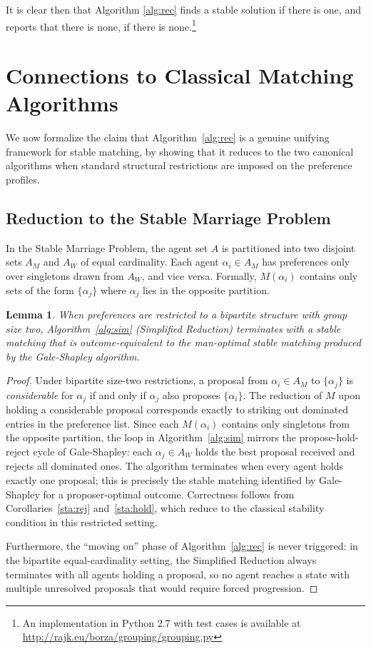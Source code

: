 \documentclass{elsarticle}
\newtheorem{mylem}{Lemma}
\begin{document}
It is clear then that Algorithm \ref{alg:rec} finds a stable solution if there is one, and reports that there is none, if there is none.\footnote{An implementation in Python 2.7 with test cases is available at \url{http://rajk.eu/borza/grouping/grouping.py}}

\section{Connections to Classical Matching Algorithms}
\label{sec:connections}

We now formalize the claim that Algorithm~\ref{alg:rec} is a genuine unifying framework for stable matching, by showing that it reduces to the two canonical algorithms when standard structural restrictions are imposed on the preference profiles.

\subsection{Reduction to the Stable Marriage Problem}

In the Stable Marriage Problem, the agent set $A$ is partitioned into two disjoint sets $A_M$ and $A_W$ of equal cardinality. Each agent $\alpha_i \in A_M$ has preferences only over singletons drawn from $A_W$, and vice versa. Formally, $M(\alpha_i)$ contains only sets of the form $\{\alpha_j\}$ where $\alpha_j$ lies in the opposite partition.

\begin{mylem}
\label{lem:gs}
When preferences are restricted to a bipartite structure with group size two, Algorithm~\ref{alg:sim} (Simplified Reduction) terminates with a stable matching that is outcome-equivalent to the man-optimal stable matching produced by the Gale-Shapley algorithm.
\end{mylem}

\begin{proof}
Under bipartite size-two restrictions, a proposal from $\alpha_i \in A_M$ to $\{\alpha_j\}$ is \emph{considerable} for $\alpha_j$ if and only if $\alpha_j$ also proposes $\{\alpha_i\}$. The reduction of $M$ upon holding a considerable proposal corresponds exactly to striking out dominated entries in the preference list. Since each $M(\alpha_i)$ contains only singletons from the opposite partition, the loop in Algorithm~\ref{alg:sim} mirrors the propose-hold-reject cycle of Gale-Shapley: each $\alpha_j \in A_W$ holds the best proposal received and rejects all dominated ones. The algorithm terminates when every agent holds exactly one proposal; this is precisely the stable matching identified by Gale-Shapley for a proposer-optimal outcome. Correctness follows from Corollaries~\ref{sta:rej} and~\ref{sta:hold}, which reduce to the classical stability condition in this restricted setting.

Furthermore, the ``moving on'' phase of Algorithm~\ref{alg:rec} is never triggered: in the bipartite equal-cardinality setting, the Simplified Reduction always terminates with all agents holding a proposal, so no agent reaches a state with multiple unresolved proposals that would require forced progression.
\end{proof}
\end{document}
